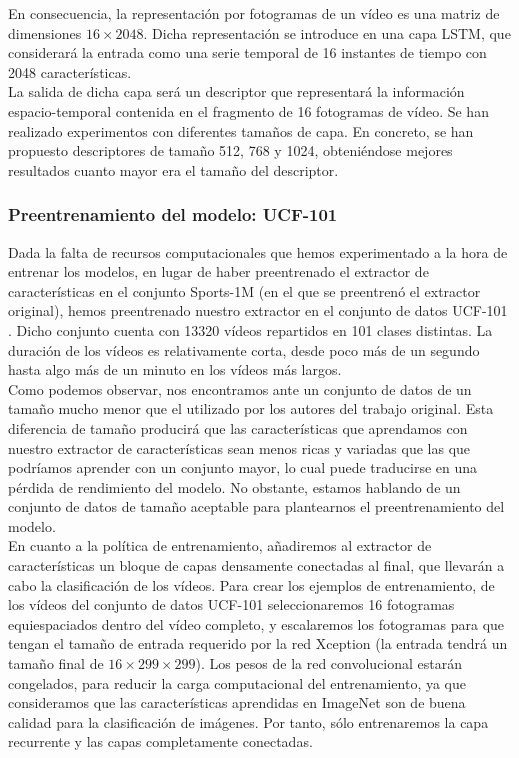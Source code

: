 \documentclass[../main.tex]{memoir}
\begin{document}
En consecuencia, la representación por fotogramas de un vídeo es una
matriz de dimensiones $16 \times 2048$. Dicha representación se
introduce en una capa LSTM, que considerará la entrada como una serie
temporal de 16 instantes de tiempo con 2048 características.\\

La salida de dicha capa será un descriptor que representará la
información espacio-temporal contenida en el fragmento de 16
fotogramas de vídeo. Se han realizado experimentos con diferentes
tamaños de capa. En concreto, se han propuesto descriptores de tamaño
512, 768 y 1024, obteniéndose mejores resultados cuanto mayor era el
tamaño del descriptor.

\subsubsection{Preentrenamiento del modelo: UCF-101}

Dada la falta de recursos computacionales que hemos experimentado a la
hora de entrenar los modelos, en lugar de haber preentrenado el
extractor de características en el conjunto Sports-1M (en el que se
preentrenó el extractor original), hemos preentrenado nuestro
extractor en el conjunto de datos UCF-101 \cite{soomro2012ucf}. Dicho
conjunto cuenta con 13320 vídeos repartidos en 101 clases
distintas. La duración de los vídeos es relativamente corta, desde
poco más de un segundo hasta algo más de
un minuto en los vídeos más largos.\\

Como podemos observar, nos encontramos ante un conjunto de datos de un
tamaño mucho menor que el utilizado por los autores del trabajo
original. Esta diferencia de tamaño producirá que las características
que aprendamos con nuestro extractor de características sean menos
ricas y variadas que las que podríamos aprender con un conjunto mayor,
lo cual puede traducirse en una pérdida de rendimiento del modelo. No
obstante, estamos hablando de un conjunto de datos de tamaño aceptable
para plantearnos el preentrenamiento del modelo.\\

En cuanto a la política de entrenamiento, añadiremos al extractor de
características un bloque de capas densamente conectadas al final, que
llevarán a cabo la clasificación de los vídeos. Para crear los
ejemplos de entrenamiento, de los vídeos del conjunto de datos UCF-101
seleccionaremos 16 fotogramas equiespaciados dentro del vídeo
completo, y escalaremos los fotogramas para que tengan el tamaño de
entrada requerido por la red Xception (la entrada tendrá un tamaño
final de $16 \times 299 \times 299$). Los pesos de la red
convolucional estarán congelados, para reducir la carga computacional
del entrenamiento, ya que consideramos que las características
aprendidas en ImageNet son de buena calidad para la clasificación
de imágenes. Por tanto, sólo entrenaremos la capa recurrente y las
capas completamente conectadas.\\
\end{document}
